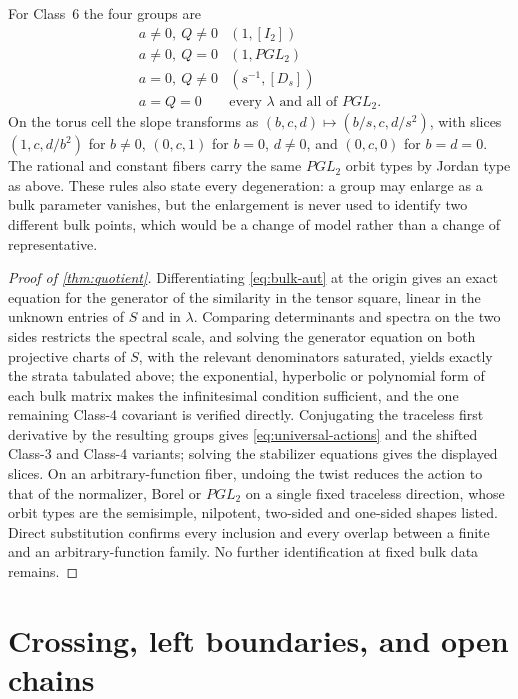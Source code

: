 \documentclass[11pt,reqno]{amsart}
\theoremstyle{plain}
\theoremstyle{definition}
\theoremstyle{remark}
\numberwithin{equation}{section}
\newcommand{\Id}{I_2}
\begin{document}
For Class~6 the four groups are
\begin{equation}
\begin{array}{c|c}
a\ne0,\ Q\ne0&(1,[\Id])\\
a\ne0,\ Q=0&(1,PGL_2)\\
a=0,\ Q\ne0&(s^{-1},[D_s])\\
a=Q=0&\text{every }\lambda\text{ and all of }PGL_2 .
\end{array}                                           \label{eq:C6-aut}
\end{equation}
On the torus cell the slope transforms as $(b,c,d)\mapsto(b/s,c,d/s^2)$, with
slices $(1,c,d/b^2)$ for $b\ne0$, $(0,c,1)$ for $b=0$, $d\ne0$, and $(0,c,0)$ for
$b=d=0$. The rational and constant fibers carry the same $PGL_2$ orbit types by
Jordan type as above. These rules also state every degeneration: a group may
enlarge as a bulk parameter vanishes, but the enlargement is never used to
identify two different bulk points, which would be a change of model rather than
a change of representative.

\begin{proof}[Proof of \cref{thm:quotient}]
Differentiating \cref{eq:bulk-aut} at the origin gives an exact equation for the
generator of the similarity in the tensor square, linear in the unknown entries of
$S$ and in $\lambda$. Comparing determinants and spectra on the two sides
restricts the spectral scale, and solving the generator equation on both
projective charts of $S$, with the relevant denominators saturated, yields exactly
the strata tabulated above; the exponential, hyperbolic or polynomial form of each
bulk matrix makes the infinitesimal condition sufficient, and the one remaining
Class-4 covariant is verified directly. Conjugating the traceless first derivative
by the resulting groups gives \cref{eq:universal-actions} and the shifted Class-3
and Class-4 variants; solving the stabilizer equations gives the displayed slices.
On an arbitrary-function fiber, undoing the twist reduces the action to that of
the normalizer, Borel or $PGL_2$ on a single fixed traceless direction, whose
orbit types are the semisimple, nilpotent, two-sided and one-sided shapes listed.
Direct substitution confirms every inclusion and every overlap between a finite
and an arbitrary-function family. No further identification at fixed bulk data
remains.
\end{proof}

\section{Crossing, left boundaries, and open chains}
\label{sec:crossing}
\end{document}
